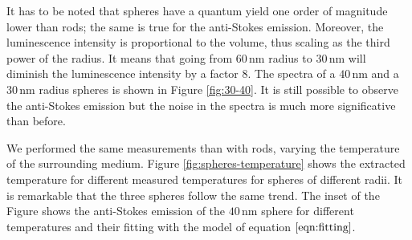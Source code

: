 \documentclass[journal=nalefd,manuscript=letter]{achemso}
\newcommand{\nm}{\ensuremath{\,\textrm{nm}}}
\begin{document}
It has to be noted that spheres have a quantum yield one order of magnitude
lower than rods; the same is true for the anti-Stokes emission. Moreover, the
luminescence intensity is proportional to the volume, thus scaling as the third 
power of the radius. It means that going from $60\nm$ radius to $30\nm$ will
diminish the luminescence intensity by a factor $8$. The spectra of a $40\nm$
and a $30\nm$ radius spheres is shown in Figure \ref{fig:30-40}. It is still
possible to observe the anti-Stokes emission but the noise in the spectra is
much more significative than before. 

We performed the same measurements than with rods, varying the temperature of
the surrounding medium. Figure \ref{fig:spheres-temperature} shows the extracted
temperature for different measured temperatures for spheres of different radii.
It is remarkable that the three spheres follow the same trend. The inset of
the Figure shows the anti-Stokes emission of the $40\nm$ sphere for different
temperatures and their fitting with the model of equation $\ref{eqn:fitting}$.
\end{document}
